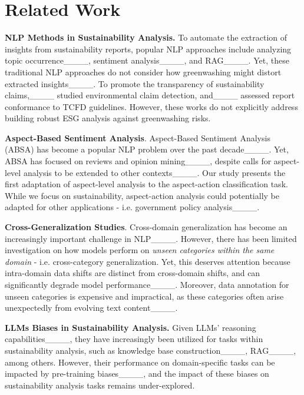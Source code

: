 \section{Related Work}
\noindent\textbf{NLP Methods in Sustainability Analysis.}
To automate the extraction of insights from sustainability reports, popular NLP approaches include analyzing topic occurrence____, sentiment analysis____, and RAG____. Yet, these traditional NLP approaches do not consider how greenwashing might distort extracted insights____. To promote the transparency of sustainability claims,____ studied environmental claim detection, and____ assessed report conformance to TCFD guidelines. However, these works do not explicitly address building robust ESG analysis against greenwashing risks.


\noindent\textbf{Aspect-Based Sentiment Analysis}.
Aspect-Based Sentiment Analysis (ABSA) has become a popular NLP problem over the past decade____. Yet, ABSA has focused on reviews and opinion mining____, despite calls for aspect-level analysis to be extended to other contexts____. Our study presents the first adaptation of aspect-level analysis to the aspect-action classification task. While we focus on sustainability, aspect-action analysis could potentially be adapted for other applications - i.e. government policy analysis____. 

\noindent \textbf{Cross-Generalization Studies}. Cross-domain generalization has become an increasingly important challenge in NLP____. However, there has been limited investigation on how models perform on \textit{unseen categories within the same domain} - i.e. cross-category generalization. Yet, this deserves attention because intra-domain data shifts are distinct from cross-domain shifts, and can significantly degrade model performance____. Moreover, data annotation for unseen categories is expensive and impractical, as these categories often arise unexpectedly from evolving text content____. 


\noindent \textbf{LLMs Biases in Sustainability Analysis.}
Given LLMs' reasoning capabilities____, they have increasingly been utilized for tasks within sustainability analysis, such as knowledge base construction____, RAG____, among others. However, their performance on domain-specific tasks can be impacted by pre-training biases____, and the impact of these biases on sustainability analysis tasks remains under-explored.